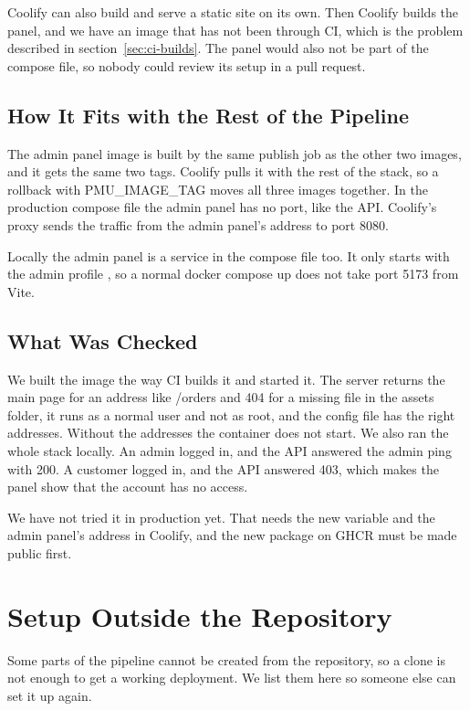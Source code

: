 \documentclass[a4paper,11pt]{article}
\begin{document}
Coolify can also build and serve a static site on its own. Then Coolify builds the panel, and we have an image that has not been through CI, which is the problem described in section~\ref{sec:ci-builds}. The panel would also not be part of the compose file, so nobody could review its setup in a pull request.

\subsection{How It Fits with the Rest of the Pipeline}
The admin panel image is built by the same publish job as the other two images, and it gets the same two tags. Coolify pulls it with the rest of the stack, so a rollback with PMU\_IMAGE\_TAG moves all three images together. In the production compose file the admin panel has no port, like the API. Coolify's proxy sends the traffic from the admin panel's address to port 8080.

Locally the admin panel is a service in the compose file too. It only starts with the admin profile \cite{docker-compose-profiles}, so a normal docker compose up does not take port 5173 from Vite.

\subsection{What Was Checked}
We built the image the way CI builds it and started it. The server returns the main page for an address like /orders and 404 for a missing file in the assets folder, it runs as a normal user and not as root, and the config file has the right addresses. Without the addresses the container does not start. We also ran the whole stack locally. An admin logged in, and the API answered the admin ping with 200. A customer logged in, and the API answered 403, which makes the panel show that the account has no access.

We have not tried it in production yet. That needs the new variable and the admin panel's address in Coolify, and the new package on GHCR must be made public first.

\section{Setup Outside the Repository}\label{sec:setup}
Some parts of the pipeline cannot be created from the repository, so a clone is not enough to get a working deployment. We list them here so someone else can set it up again.
\end{document}
